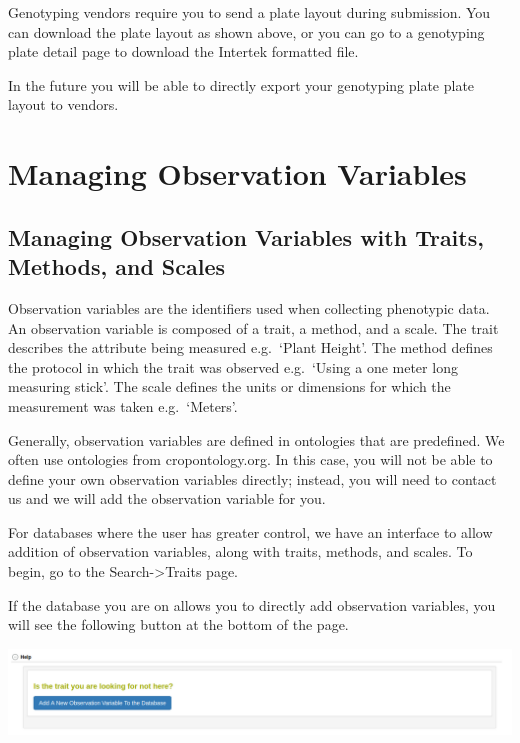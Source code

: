 \documentclass[
  12pt,
]{book}
\begin{document}
Genotyping vendors require you to send a plate layout during submission. You can download the plate layout as shown above, or you can go to a genotyping plate detail page to download the Intertek formatted file.

In the future you will be able to directly export your genotyping plate plate layout to vendors.

\hypertarget{managing-observation-variables}{%
\chapter{Managing Observation Variables}\label{managing-observation-variables}}

\hypertarget{managing-observation-variables-with-traits-methods-and-scales}{%
\section{Managing Observation Variables with Traits, Methods, and Scales}\label{managing-observation-variables-with-traits-methods-and-scales}}

Observation variables are the identifiers used when collecting phenotypic data. An observation variable is composed of a trait, a method, and a scale. The trait describes the attribute being measured e.g.~`Plant Height'. The method defines the protocol in which the trait was observed e.g.~`Using a one meter long measuring stick'. The scale defines the units or dimensions for which the measurement was taken e.g.~`Meters'.

Generally, observation variables are defined in ontologies that are predefined. We often use ontologies from cropontology.org. In this case, you will not be able to define your own observation variables directly; instead, you will need to contact us and we will add the observation variable for you.

For databases where the user has greater control, we have an interface to allow addition of observation variables, along with traits, methods, and scales. To begin, go to the Search-\textgreater Traits page.

If the database you are on allows you to directly add observation variables, you will see the following button at the bottom of the page.

\begin{center}\includegraphics[width=0.95\linewidth]{assets/images/manage_observation_variables_start_button} \end{center}
\end{document}
